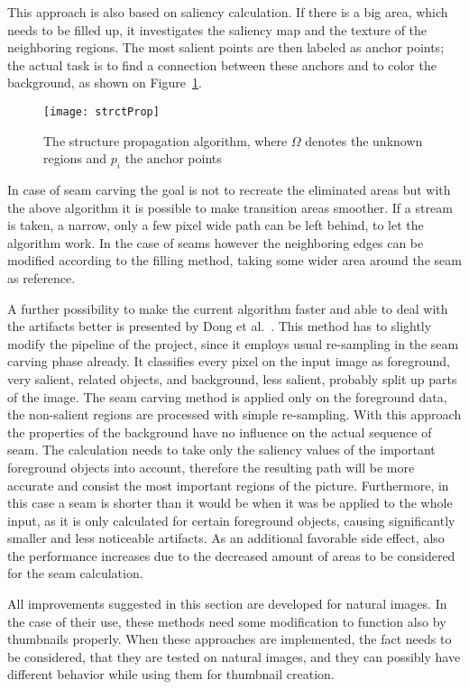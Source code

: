 \documentclass[draft,final]{vutinfth} %
\begin{document}
	This approach is also based on saliency calculation.
	If there is a big area, which needs to be filled up, it investigates the saliency map and the texture of the neighboring regions.
	The most salient points are then labeled as anchor points; the actual task is to find a connection between these anchors and to color the background, as shown on Figure~\ref{fig:structProp}.
	\begin{figure}[H]
		\centering		
		\texttt{[image: strctProp]}
		\caption{The structure propagation algorithm, where $\Omega$ denotes the unknown regions and $p_{i}$ the anchor points ~\cite{sun2005image}} 
		\label{fig:structProp}
	\end{figure}
	In case of seam carving the goal is not to recreate the eliminated areas but with the above algorithm it is possible to make transition areas smoother.
	If a stream is taken, a narrow, only a few pixel wide path can be left behind, to let the algorithm work.
	In the case of seams however the neighboring edges can be modified according to the filling method, taking some wider area around the seam as reference.\par 
	A further possibility to make the current algorithm faster and able to deal with the artifacts better is presented by Dong et al.~\cite{dong2009optimized}.
	This method has to slightly modify the pipeline of the project, since it employs usual re-sampling in the seam carving phase already.
	It classifies every pixel on the input image as foreground, very salient, related objects, and background, less salient, probably split up parts of the image.
	The seam carving method is applied only on the foreground data, the non-salient regions are processed with simple re-sampling. 
	With this approach the properties of the background have no influence on the actual sequence of seam.
	The calculation needs to take only the saliency values of the important foreground objects into account, therefore the resulting path will be more accurate and consist the most important regions of the picture.
	Furthermore, in this case a seam is shorter than it would be when it was be applied to the whole input, as it is only calculated for certain foreground objects, causing significantly smaller and less noticeable artifacts.
	As an additional favorable side effect, also the performance increases due to the decreased amount of areas to be considered for the seam calculation.\par
	All improvements suggested in this section are developed for natural images.
	In the case of their use, these methods need some modification to function also by thumbnails properly.
	When these approaches are implemented, the fact needs to be considered, that they are tested on natural images, and they can possibly have different behavior while using them for thumbnail creation.     
	
\end{document}

